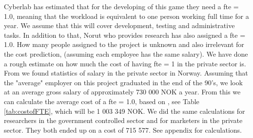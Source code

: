 Cyberlab has estimated that for the developing of this game they need a \ac{fte} = 1.0, meaning that the workload is equivalent to one person working full time for a year. We assume that this will cover development, testing and administrative tasks. In addition to that, Norut who provides research has also assigned a \ac{fte} = 1.0. How many people assigned to the project is unknown and also irrelevant for the cost prediction, (assuming each employee has the same salary). We have done a rough estimate on how much the cost of having \ac{fte} = 1 in the private sector is. From \cite{tekna} we found statistics of salary in the private sector in Norway. Assuming that the "average" employer on this project graduated in the end of the 90's, we look at an average gross salary of approximately 730 000 NOK a year. From this we can calculate the average cost of a \ac{fte} = 1.0, based on \cite{altinn}, see Table \ref{tab:costofFTE}, which will be 1 003 349 NOK. We did the same calculations for researchers in the government controlled sector and for marketers in the private sector. They both ended up on a cost of 715 577. See appendix for calculations. \\ \\

